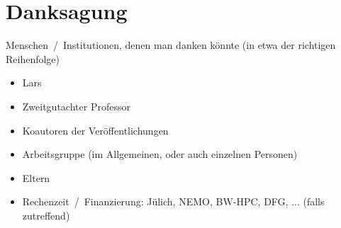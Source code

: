 \chapter*{Danksagung}
Menschen~/~Institutionen, denen man danken könnte (in etwa der richtigen Reihenfolge)

\begin{itemize}
  \item Lars
  \item Zweitgutachter Professor
  \item Koautoren der Veröffentlichungen
  \item Arbeitsgruppe (im Allgemeinen, oder auch einzelnen Personen)
  \item Eltern
  \item Rechenzeit~/~Finanzierung: Jülich, NEMO, BW-HPC, DFG, ... (falls zutreffend)
\end{itemize}







